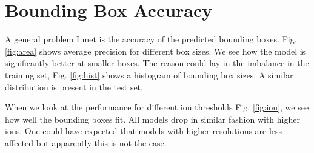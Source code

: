 \documentclass{article}
\begin{document}
\section{Bounding Box Accuracy}

A general problem I met is the accuracy of the predicted bounding boxes. Fig. \ref{fig:area} shows average precision for different box sizes. We see how the model is significantly better at smaller boxes. The reason could lay in the imbalance in the training set, Fig. \ref{fig:hist} shows a histogram of bounding box sizes. A similar distribution is present in the test set.

When we look at the performance for different iou thresholds Fig. \ref{fig:iou}, we see how well the bounding boxes fit. All models drop in similar fashion with higher ious. One could have expected that models with higher resolutions are less affected but apparently this is not the case.
\end{document}
